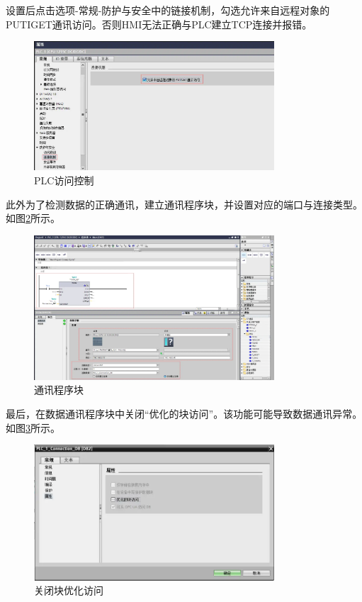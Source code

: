 \documentclass[UTF8]{article}
\begin{document}
设置后点击选项-常规-防护与安全中的链接机制，勾选允许来自远程对象的PUTIGET通讯访问。否则HMI无法正确与PLC建立TCP连接并报错。
\begin{figure}[H]
    \centering %
    \includegraphics[width=0.8\textwidth]{figure/PLC访问控制.png} 
    \caption{PLC访问控制} %
    \label{fig:img20} %
\end{figure}

此外为了检测数据的正确通讯，建立通讯程序块，并设置对应的端口与连接类型。如图\ref{fig:img21}所示。
\begin{figure}[H]
    \centering %
    \includegraphics[width=0.8\textwidth]{figure/通讯程序块.png} 
    \caption{通讯程序块} %
    \label{fig:img21} %
\end{figure}

最后，在数据通讯程序块中关闭“优化的块访问”。该功能可能导致数据通讯异常。如图\ref{fig:img22}所示。
\begin{figure}[H]
    \centering %
    \includegraphics[width=0.8\textwidth]{figure/关闭块优化访问.png} 
    \caption{关闭块优化访问} %
    \label{fig:img22} %
\end{figure}
\end{document}
